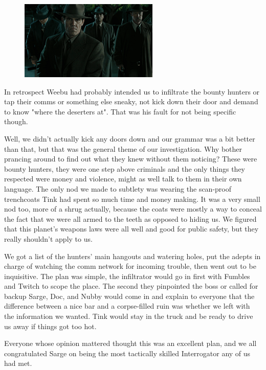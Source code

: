 \begin{figure}
	\begin{center}
		\includegraphics[width=\figwidth]{pics/10/21.png}
	\end{center}
\end{figure}
In retrospect Weebu had probably intended us to infiltrate the bounty hunters or tap their comms or something else sneaky, not kick down their door and demand to know "where the deserters at". 
That was his fault for not being specific though.

Well, we didn't actually kick any doors down and our grammar was a bit better than that, but that was the general theme of our investigation. 
Why bother prancing around to find out what they knew without them noticing? 
These were bounty hunters, they were one step above criminals and the only things they respected were money and violence, might as well talk to them in their own language. 
The only nod we made to subtlety was wearing the scan-proof trenchcoats Tink had spent so much time and money making. 
It was a very small nod too, more of a shrug actually, because the coats were mostly a way to conceal the fact that we were all armed to the teeth as opposed to hiding us. 
We figured that this planet's weapons laws were all well and good for public safety, but they really shouldn't apply to us.

We got a list of the hunters' main hangouts and watering holes, put the adepts in charge of watching the comm network for incoming trouble, then went out to be inquisitive. 
The plan was simple, the infiltrator would go in first with Fumbles and Twitch to scope the place. 
The second they pinpointed the boss or called for backup Sarge, Doc, and Nubby would come in and explain to everyone that the difference between a nice bar and a corpse-filled ruin was whether we left with the information we wanted. 
Tink would stay in the truck and be ready to drive us away if things got too hot.

Everyone whose opinion mattered thought this was an excellent plan, and we all congratulated Sarge on being the most tactically skilled Interrogator any of us had met.


